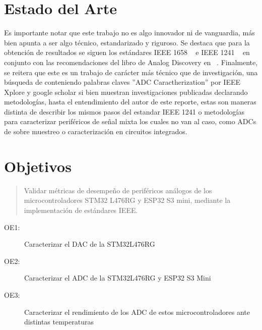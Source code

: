 \documentclass{article}
\begin{document}
\section{Estado del Arte}
Es importante notar que este trabajo no es algo innovador ni de vanguardia, más bien apunta a ser algo técnico, estandarizado y riguroso. Se destaca que para la obtención de resultados se siguen los estándares IEEE 1658 ~\cite{DAC} e IEEE 1241 ~\cite{ADC} en conjunto con las recomendaciones del libro de Analog Discovery en ~\cite{Analog_devices}. Finalmente, se reitera que este es un trabajo de carácter más técnico que de investigación, una búsqueda de conteniendo palabras claves ''ADC Caractherization''  por IEEE Xplore y google scholar si bien muestran investigaciones publicadas declarando metodologías, hasta el entendimiento del autor de este reporte, estas son maneras distinta de describir los mismos pasos del estandar IEEE 1241 o metodologías para caracterizar periféricos de señal mixta los cuales no van al caso, como ADCs de sobre muestreo o caracterización en circuitos integrados.
\section{Objetivos}
\begin{quote}
Validar métricas de desempeño de periféricos análogos de los microcontroladores STM32 L476RG y ESP32 S3 mini, mediante la implementación de estándares IEEE.   
\end{quote}
\begin{description}
    \item[OE1:] Caracterizar el DAC de la STM32L476RG
    \item[OE2:] Caracterizar el ADC de la STM32L476RG y ESP32 S3 Mini
    \item[OE3:] Caracterizar el rendimiento de los ADC de estos microcontroladores ante distintas temperaturas
\end{description}
\end{document}
